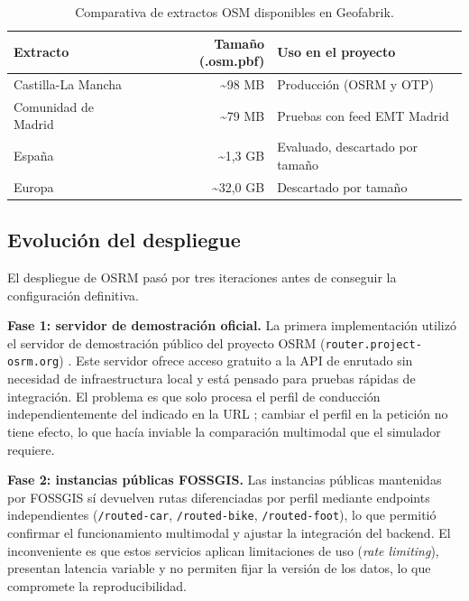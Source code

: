 \begin{table}[H]
  \caption{Comparativa de extractos OSM disponibles en Geofabrik.}
  \label{tab:osm_extractos}
  \centering
  \begin{tabular}{lrl}
    \toprule
    \textbf{Extracto} & \textbf{Tamaño (.osm.pbf)} & \textbf{Uso en el proyecto} \\
    \midrule
    Castilla-La Mancha  & \textasciitilde{}98 MB     & Producción (OSRM y OTP) \\
    Comunidad de Madrid & \textasciitilde{}79 MB     & Pruebas con feed EMT Madrid \\
    España              & \textasciitilde{}1{,}3 GB  & Evaluado, descartado por tamaño \\
    Europa              & \textasciitilde{}32{,}0 GB & Descartado por tamaño \\
    \bottomrule
  \end{tabular}
\end{table}

\subsection{Evolución del despliegue}
\label{subsec:impl_osrm_evolucion}

El despliegue de OSRM pasó por tres iteraciones antes de conseguir la configuración definitiva.

\textbf{Fase 1: servidor de demostración oficial.} La primera implementación utilizó el servidor de demostración público del proyecto OSRM (\texttt{router.project-osrm.org}) \cite{OSRMDocs}. Este servidor ofrece acceso gratuito a la API de enrutado sin necesidad de infraestructura local y está pensado para pruebas rápidas de integración. El problema es que solo procesa el perfil de conducción independientemente del indicado en la URL \cite{OSRMIssue4034}; cambiar el perfil en la petición no tiene efecto, lo que hacía inviable la comparación multimodal que el simulador requiere.

\textbf{Fase 2: instancias públicas FOSSGIS.} Las instancias públicas mantenidas por FOSSGIS \cite{FOSSGISRouting} sí devuelven rutas diferenciadas por perfil mediante endpoints independientes (\texttt{/routed-car}, \texttt{/routed-bike}, \texttt{/routed-foot}), lo que permitió confirmar el funcionamiento multimodal y ajustar la integración del backend. El inconveniente es que estos servicios aplican limitaciones de uso (\textit{rate limiting}), presentan latencia variable y no permiten fijar la versión de los datos, lo que compromete la reproducibilidad.

